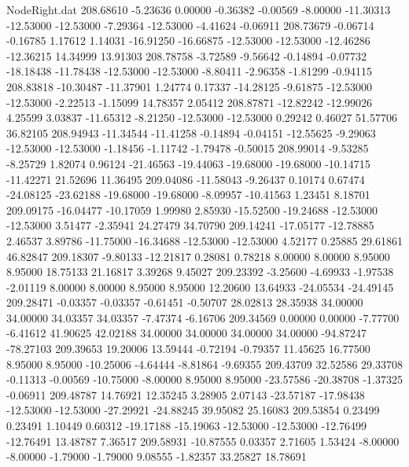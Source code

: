 \begin{filecontents}{NodeRight.dat}
 208.68610   -5.23636    0.00000    -0.36382   -0.00569   -8.00000  -11.30313  -12.53000  -12.53000   -7.29364  -12.53000   -4.41624   -0.06911
 208.73679   -0.06714   -0.16785     1.17612    1.14031  -16.91250  -16.66875  -12.53000  -12.53000  -12.46286  -12.36215   14.34999   13.91303
 208.78758   -3.72589   -9.56642    -0.14894   -0.07732  -18.18438  -11.78438  -12.53000  -12.53000   -8.80411   -2.96358   -1.81299   -0.94115
 208.83818  -10.30487  -11.37901     1.24774    0.17337  -14.28125   -9.61875  -12.53000  -12.53000   -2.22513   -1.15099   14.78357    2.05412
 208.87871  -12.82242  -12.99026     4.25599    3.03837  -11.65312   -8.21250  -12.53000  -12.53000    0.29242    0.46027   51.57706   36.82105
 208.94943  -11.34544  -11.41258    -0.14894   -0.04151  -12.55625   -9.29063  -12.53000  -12.53000   -1.18456   -1.11742   -1.79478   -0.50015
 208.99014   -9.53285   -8.25729     1.82074    0.96124  -21.46563  -19.44063  -19.68000  -19.68000  -10.14715  -11.42271   21.52696   11.36495
 209.04086  -11.58043   -9.26437     0.10174    0.67474  -24.08125  -23.62188  -19.68000  -19.68000   -8.09957  -10.41563    1.23451    8.18701
 209.09175  -16.04477  -10.17059     1.99980    2.85930  -15.52500  -19.24688  -12.53000  -12.53000    3.51477   -2.35941   24.27479   34.70790
 209.14241  -17.05177  -12.78885     2.46537    3.89786  -11.75000  -16.34688  -12.53000  -12.53000    4.52177    0.25885   29.61861   46.82847
 209.18307   -9.80133  -12.21817     0.28081    0.78218    8.00000    8.00000    8.95000    8.95000   18.75133   21.16817    3.39268    9.45027
 209.23392   -3.25600   -4.69933    -1.97538   -2.01119    8.00000    8.00000    8.95000    8.95000   12.20600   13.64933  -24.05534  -24.49145
 209.28471   -0.03357   -0.03357    -0.61451   -0.50707   28.02813   28.35938   34.00000   34.00000   34.03357   34.03357   -7.47374   -6.16706
 209.34569    0.00000    0.00000    -7.77700   -6.41612   41.90625   42.02188   34.00000   34.00000   34.00000   34.00000  -94.87247  -78.27103
 209.39653   19.20006   13.59444    -0.72194   -0.79357   11.45625   16.77500    8.95000    8.95000  -10.25006   -4.64444   -8.81864   -9.69355
 209.43709   32.52586   29.33708    -0.11313   -0.00569  -10.75000   -8.00000    8.95000    8.95000  -23.57586  -20.38708   -1.37325   -0.06911
 209.48787   14.76921   12.35245     3.28905    2.07143  -23.57187  -17.98438  -12.53000  -12.53000  -27.29921  -24.88245   39.95082   25.16083
 209.53854    0.23499    0.23491     1.10449    0.60312  -19.17188  -15.19063  -12.53000  -12.53000  -12.76499  -12.76491   13.48787    7.36517
 209.58931  -10.87555    0.03357     2.71605    1.53424   -8.00000   -8.00000   -1.79000   -1.79000    9.08555   -1.82357   33.25827   18.78691

\end{filecontents}
